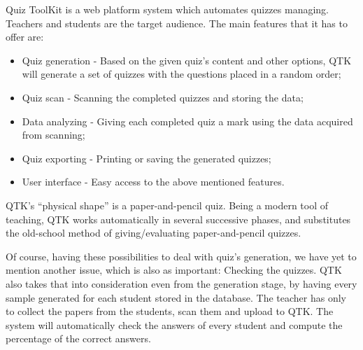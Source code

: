 Quiz ToolKit is a web platform system which automates quizzes managing. Teachers and students are the target audience. The main features that it has to offer are:
\begin{itemize}
  \item Quiz generation - Based on the given quiz’s content and other options, QTK will generate a set of quizzes with the questions placed in a random order;
  \item Quiz scan - Scanning the completed quizzes and storing the data;
  \item Data analyzing - Giving each completed quiz a mark using the data acquired from scanning;
  \item Quiz exporting - Printing or saving the generated quizzes;
  \item User interface - Easy access to the above mentioned features.
\end{itemize}

QTK's ``physical shape'' is a paper-and-pencil quiz. Being a modern tool of teaching, QTK works automatically in several successive phases, and substitutes the old-school method of giving/evaluating paper-and-pencil quizzes. 

Of course, having these possibilities to deal with quiz’s generation, we have yet to mention another issue, which is also as important: Checking the quizzes. QTK also takes that into consideration even from the generation stage, by having every sample generated for each student stored in the database. The teacher has only to collect the papers from the students, scan them and upload to QTK. The system will automatically check the answers of every student and compute the percentage of the correct answers.


\clearpage
